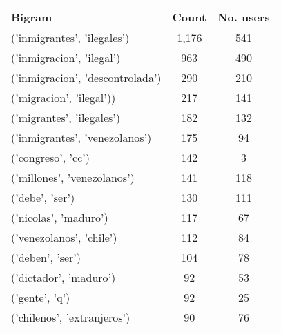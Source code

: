 %
    
    \begin{tabular}{lcc}
        \toprule\toprule
        Bigram & Count & No. users\\ \midrule
        ('inmigrantes', 'ilegales') & 1,176 & 541 \\ 
        ('inmigracion', 'ilegal') &  963 & 490 \\ 
        ('inmigracion', 'descontrolada') &  290 & 210 \\ 
        ('migracion', 'ilegal')) &  217 & 141 \\
        ('migrantes', 'ilegales') & 182 & 132 \\ 
        ('inmigrantes', 'venezolanos') & 175 & 94 \\ 
        ('congreso', 'cc') & 142 & 3 \\ 
        ('millones', 'venezolanos') & 141 & 118 \\
        ('debe', 'ser') & 130 & 111 \\ 
        ('nicolas', 'maduro') & 117 & 67 \\
        ('venezolanos', 'chile') & 112 & 84 \\ 
        ('deben', 'ser') & 104 & 78 \\ 
        ('dictador', 'maduro') & 92 & 53 \\
        ('gente', 'q') & 92 & 25 \\
        ('chilenos', 'extranjeros') & 90 & 76 \\
        \bottomrule\bottomrule
    \end{tabular}

%